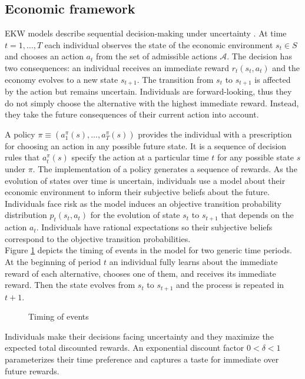\subsection{Economic framework}
EKW models describe sequential decision-making under uncertainty \citep{Gilboa.2009, Machina.2014}. At time $t = 1, \hdots, T$ each individual observes the state of the economic environment $s_t\in S$ and chooses an action $a_t$ from the set of admissible actions $\mathcal{A}$. The decision has two consequences: an individual receives an immediate reward $r_t(s_t, a_t)$ and the economy evolves to a new state $s_{t + 1}$. The transition from $s_t$ to $s_{t + 1}$ is affected by the action but remains uncertain. Individuals are forward-looking, thus they do not simply choose the alternative with the highest immediate reward. Instead, they take the future consequences of their current action into account.\\

\noindent

A policy $\pi \equiv(a^\pi_1(s), \hdots, a^\pi_T(s))$ provides the individual with a prescription for choosing an action in any possible future state.  It is a sequence of decision rules  that $a^\pi_t(s)$ specify the action at a particular time $t$ for any possible state $s$ under $\pi$. The implementation of a policy generates a sequence of rewards. As the evolution of states over time is uncertain, individuals use a model about their economic environment to inform their subjective beliefs about the future. Individuals face risk as the model induces an objective transition probability distribution $p_t(s_t, a_t)$ for the evolution of state $s_t$ to $s_{t + 1}$ that depends on the action $a_t$. Individuals have rational expectations \citep{Lucas.1972, Muth.1961} so their subjective beliefs correspond to the objective transition probabilities.\\

\noindent Figure \ref{Timing} depicts the timing of events in the model for two generic time periods. At the beginning of period $t$ an individual fully learns about the immediate reward of each alternative, chooses one of them, and receives its immediate reward. Then the state evolves from $s_t$ to $s_{t + 1}$ and the process is repeated in $t + 1$.
%
\begin{figure}\caption{Timing of events}\label{Timing}\vspace{1.0cm}\centering

\end{figure}
%
\noindent Individuals make their decisions facing uncertainty and they maximize the expected total discounted rewards. An exponential discount factor $0 < \delta < 1$ parameterizes their time preference and captures a taste for immediate over future rewards.\\

